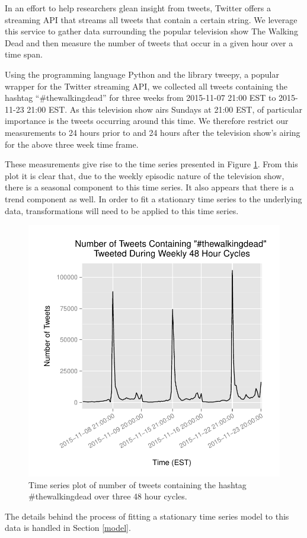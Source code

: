 In an effort to help researchers glean insight from tweets, Twitter offers
a streaming API that streams all tweets that contain a certain string.
We leverage this service to gather data surrounding the popular television
show The Walking Dead and then measure the number of tweets that occur in a given
hour over a time span.

Using the programming language Python and the library tweepy, a popular
wrapper for the Twitter streaming API, we collected all tweets containing the
hashtag ``\#thewalkingdead'' for three weeks from 2015-11-07 21:00 EST to
2015-11-23 21:00 EST. As this television show airs Sundays at 21:00 EST,
of particular importance is the tweets occurring around this time.
We therefore restrict our measurements to 24 hours prior to and 24 hours after
the television show's airing for the above three week time frame.

These measurements give rise to the time series presented in Figure \ref{tweets_plot}.
From this plot it is clear that, due to the weekly episodic nature of the television
show, there is a seasonal component to this time series. It also appears that
there is a trend component as well. In order to fit a stationary time series
to the underlying data, transformations will need to be applied to this time
series.

\begin{figure}[!t]
  \centerline{\includegraphics[scale=0.75]{../analysis/plots/tweets_plot}}
  \caption{Time series plot of number of tweets containing the hashtag
  \#thewalkingdead over three 48 hour cycles.}\label{tweets_plot}
\end{figure}

The details behind the process of fitting a stationary time series model to this data is handled in
Section \ref{model}.